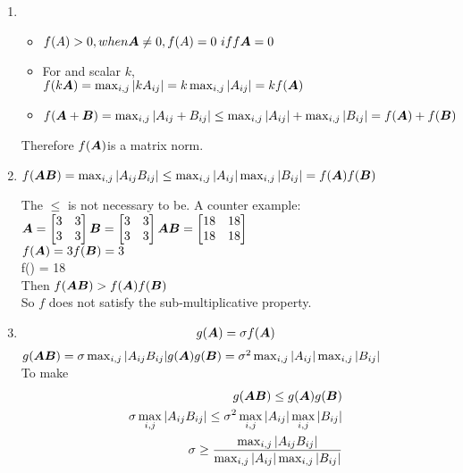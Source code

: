 \documentclass{article}
\begin{document}
\begin{enumerate} 

\item 
\begin{itemize}
\item  $f(A)>0, when \mA\neq0, \\ f(A)=0\ iff \mA=0 $
\item For and scalar $k$, \\  $ f(k\boldsymbol{A}) \\= \max_{i,j}|kA_{ij}| \\= k\max_{i,j}|A_{ij}| \\=kf(\boldsymbol{A})$
\item
$f(\boldsymbol{A}+\boldsymbol{B}) \\
=\max_{i,j}|A_{ij}+B_{ij}| \\ 
\leq \max_{i,j}|A_{ij}| + \max_{i,j}|B_{ij}| \\
=f(\boldsymbol{A}) + f(\boldsymbol{B})$
\end{itemize}
Therefore $f(\boldsymbol{A})$is a matrix norm. 
\item 
$f(\boldsymbol{A}\boldsymbol{B}) \\
=\max_{i,j}|A_{ij}B_{ij}|\\ 
\leq \max_{i,j}|A_{ij}|  \max_{i,j}|B_{ij}| \\
=f(\boldsymbol{A})f(\boldsymbol{B})$

The $\leq$ is not necessary to be.  A counter example: \\
$\boldsymbol{A}= \begin{bmatrix} 3 &3\\3&3 \end{bmatrix} \\
\boldsymbol{B}= \begin{bmatrix} 3&3\\3&3 \end{bmatrix} \\ 
\boldsymbol{A}\boldsymbol{B}= \begin{bmatrix} 18&18\\18&18 \end{bmatrix} $\\
$f(\boldsymbol{A}) = 3 \\ 
f(\boldsymbol{B}) = 3 $\\
f(\mA\mB) = 18 \\
Then $ f(\boldsymbol{A}\boldsymbol{B}) > f(\boldsymbol{A})f(\boldsymbol{B})  $\\
So $f$ does not satisfy the sub-multiplicative property. 

\item 
\begin{align} 
g(\boldsymbol{A}) = \sigma f(\boldsymbol{A}) 
\end{align}
$g(\boldsymbol{A}\boldsymbol{B}) =\sigma \max_{i,j}|A_{ij}B_{ij}|\\ 
g(\boldsymbol{A})g(\boldsymbol{B}) =\sigma^2\max_{i,j}|A_{ij}|  \max_{i,j}|B_{ij}|\\$\\
To make 
\begin{align} 
g(\boldsymbol{A}\boldsymbol{B}) \leq g(\boldsymbol{A})g(\boldsymbol{B}) \\
\sigma \max_{i,j}|A_{ij}B_{ij}| \leq \sigma^2\max_{i,j}|A_{ij}|  \max_{i,j}|B_{ij}| \\
\sigma \geq\frac{\max_{i,j}|A_{ij}B_{ij}|}{\max_{i,j}|A_{ij}|  \max_{i,j}|B_{ij}|} \\
\end{align}

\end{enumerate} 
\end{document}
